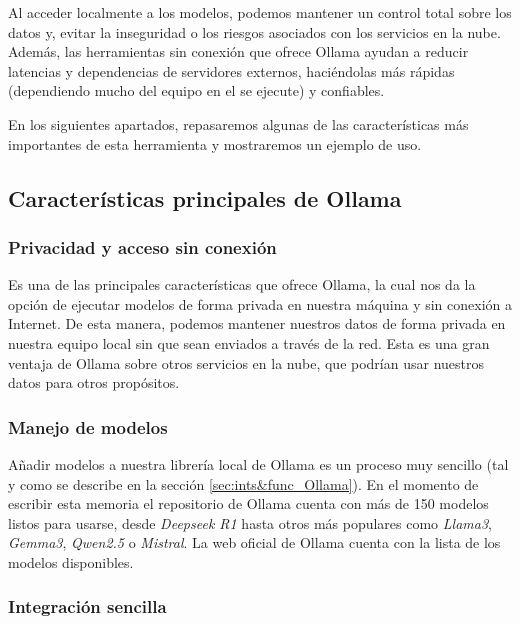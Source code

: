         \noindent Al acceder localmente a los modelos, podemos mantener un control total sobre los datos y, evitar la inseguridad o los riesgos asociados con los servicios en la nube. Además, las herramientas sin conexión que ofrece Ollama ayudan a reducir latencias y dependencias de servidores externos, haciéndolas más rápidas (dependiendo mucho del equipo en el se ejecute) y confiables.

        \noindent En los siguientes apartados, repasaremos algunas de las características más importantes de esta herramienta y mostraremos un ejemplo de uso.
        
        \subsection{Características principales de Ollama}

            \subsubsection{Privacidad y acceso sin conexión}

                Es una de las principales características \cite{0010_Ollama1} que ofrece Ollama, la cual nos da la opción de ejecutar modelos de forma privada en nuestra máquina y sin conexión a Internet. De esta manera, podemos mantener nuestros datos de forma privada en nuestra equipo local sin que sean enviados a través de la red. Esta es una gran ventaja de Ollama sobre otros servicios en la nube, que podrían usar nuestros datos para otros propósitos.

            \subsubsection{Manejo de modelos}

                Añadir modelos a nuestra librería \cite{0010_Ollama1} local de Ollama es un proceso muy sencillo (tal y como se describe en la sección \ref{sec:ints&func_Ollama}). En el momento de escribir esta memoria el repositorio de Ollama cuenta con más de 150 modelos listos para usarse, desde \textit{Deepseek R1} hasta otros más populares como \textit{Llama3}, \textit{Gemma3}, \textit{Qwen2.5} o \textit{Mistral}. La web oficial de Ollama cuenta con la lista de los modelos disponibles.

            \subsubsection{Integración sencilla}

